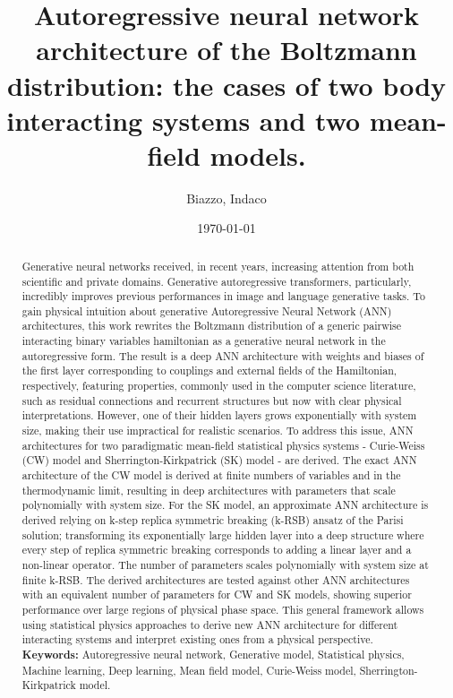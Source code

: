 \documentclass[aps,physrev,10pt,floatfix,longbibliography,nofootinbib,reprint]{revtex4-2}
\begin{document}
\title{Autoregressive neural network architecture of the Boltzmann distribution: the cases of two body interacting systems and two mean-field models.}
\author{Biazzo, Indaco}
\date{\today}

\begin{abstract}
    Generative neural networks received, in recent years, increasing attention from both scientific and private domains. Generative autoregressive transformers, particularly, incredibly improves previous performances in image and language generative tasks. To gain physical intuition about generative Autoregressive Neural Network (ANN) architectures, this work rewrites the Boltzmann distribution of a generic pairwise interacting binary variables hamiltonian as a generative neural network in the autoregressive form. The result is a deep ANN architecture with weights and biases of the first layer corresponding to couplings and external fields of the Hamiltonian, respectively, featuring properties, commonly used in the computer science literature, such as residual connections and recurrent structures but now with clear physical interpretations. However, one of their hidden layers grows exponentially with system size, making their use impractical for realistic scenarios. To address this issue, ANN architectures for two paradigmatic mean-field statistical physics systems - Curie-Weiss (CW) model and Sherrington-Kirkpatrick (SK) model - are derived. The exact ANN architecture of the CW model is derived at finite numbers of variables and in the thermodynamic limit, resulting in deep architectures with parameters that scale polynomially with system size. For the SK model, an approximate ANN architecture is derived relying on k-step replica symmetric breaking (k-RSB) ansatz of the Parisi solution; transforming its exponentially large hidden layer into a deep structure where every step of replica symmetric breaking corresponds to adding a linear layer and a non-linear operator. The number of parameters scales polynomially with system size at finite k-RSB. The derived architectures are tested against other ANN architectures with an equivalent number of parameters for CW and SK models, showing superior performance over large regions of physical phase space. This general framework allows using statistical physics approaches to derive new ANN architecture for different interacting systems and interpret existing ones from a physical perspective.    \\
    \textbf{Keywords:} Autoregressive neural network, Generative model, Statistical physics, Machine learning, Deep learning, Mean field model, Curie-Weiss model, Sherrington-Kirkpatrick model.  
\end{abstract}
    
\end{document}
